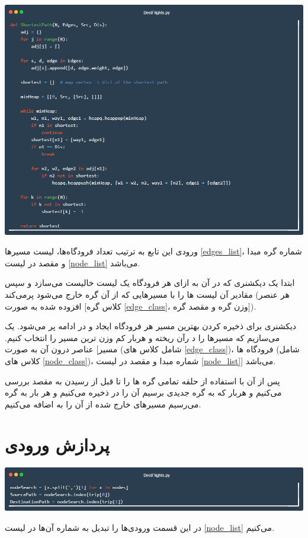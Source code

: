 \documentclass[12pt, dvipsnames, svgnames, x11names,]{article}
\begin{document}
		{\includegraphics[width=14cm]{images/code09}} \par
		{\normalsize 
		ورودی این تابع به ترتیب تعداد فرودگاه‌ها، لیست مسیرها \ref{edges_list}، شماره گره مبدا و مقصد در لیست \ref{node_list} می‌باشد.
		
		ابتدا یک دیکشنری که در آن به ازای هر فرودگاه یک لیست خالیست می‌سازد و سپس مقادیر آن لیست ها را با مسیرهایی که از آن گره خارج می‌شود پرمی‌کند (هر عنصر افزوده شده به صورت  [کلاس گره \ref{edge_class}، وزن گره و مقصد گره]).
		
		دیکشنری  برای ذخیره کردن بهترین مسیر هر فرودگاه ایجاد و در ادامه پر می‌شود.
		یک  می‌سازیم که مسیرها را د رآن ریخته و هربار کم وزن ترین مسیر را انتخاب کنیم. عناصر درون آن به صورت [مسیر (شامل کلاس های \ref{edge_class})، فرودگاه ها (شامل کلاس های \ref{node_class})، شماره مبدا و مقصد در لیست \ref{node_list}] می‌باشد.
		
		پس از آن با استفاده از حلقه  تمامی گره ها را تا قبل از رسیدن به مقصد بررسی می‌کنیم و هربار که به گره جدیدی برسیم آن را در  ذخیره می‌کنیم و هر بار به گره می‌رسیم مسیرهای خارج شده از آن را به  اضافه می‌کنیم.
		}


	\section{پردازش ورودی} \label{input_proccess}

		{\includegraphics[width=14cm]{images/code10}} \par
		{\normalsize در این قسمت ورودی‌ها را تبدیل به شماره آن‌ها در لیست \ref{node_list} می‌کنیم.}
\end{document}
